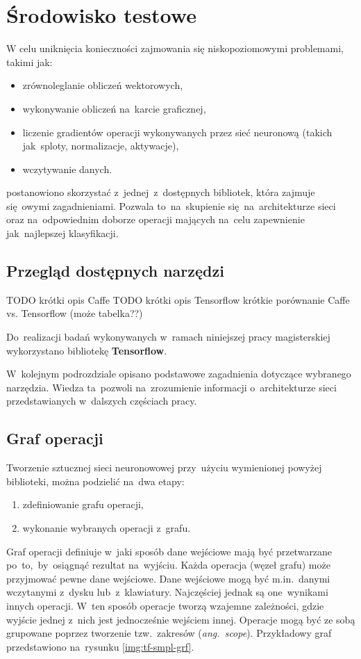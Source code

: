 \chapter{Środowisko testowe}
W celu uniknięcia konieczności zajmowania się niskopoziomowymi problemami, takimi jak:
\begin{itemize}
    \item zrównoleglanie obliczeń wektorowych,
    \item wykonywanie obliczeń na~karcie graficznej,
    \item liczenie gradientów operacji wykonywanych przez sieć neuronową (takich jak~sploty, normalizacje, aktywacje),
    \item wczytywanie danych.
\end{itemize}
postanowiono skorzystać z~jednej~z~dostępnych bibliotek, która zajmuje się~owymi zagadnieniami. Pozwala to~na~skupienie
się~na~architekturze sieci oraz na~odpowiednim doborze operacji mających na~celu zapewnienie jak~najlepszej
klasyfikacji.

\section{Przegląd dostępnych narzędzi}
TODO krótki opis Caffe
TODO krótki opis Tensorflow
krótkie porównanie Caffe vs. Tensorflow (może tabelka??)

Do~realizacji badań wykonywanych w~ramach niniejszej pracy magisterskiej wykorzystano bibliotekę
\textbf{Tensorflow}.

W~kolejnym podrozdziale opisano podstawowe zagadnienia dotyczące wybranego narzędzia. Wiedza ta~pozwoli na~zrozumienie
informacji o~architekturze sieci przedstawianych w~dalszych częściach pracy.

\section{Graf operacji}
Tworzenie sztucznej sieci neuronowowej przy~użyciu wymienionej powyżej biblioteki, można podzielić na~dwa etapy:
\begin{enumerate}
    \item zdefiniowanie grafu operacji,
    \item wykonanie wybranych operacji z~grafu.
\end{enumerate}

Graf operacji definiuje w~jaki sposób dane wejściowe mają być przetwarzane po~to,~by~osiągnąć rezultat na~wyjściu.
Każda operacja (węzeł grafu) może przyjmować pewne dane wejściowe. Dane wejściowe mogą być m.in.~danymi wczytanymi
z~dysku lub~z~klawiatury. Najczęściej jednak są one~wynikami innych operacji. W~ten sposób operacje tworzą wzajemne
zależności, gdzie wyjście jednej z~nich jest jednocześnie wejściem innej. Operacje mogą być ze sobą grupowane poprzez
tworzenie tzw.~zakresów (\textit{ang.~scope}). Przykładowy graf przedstawiono na~rysunku \ref{img:tf-smpl-grf}.

